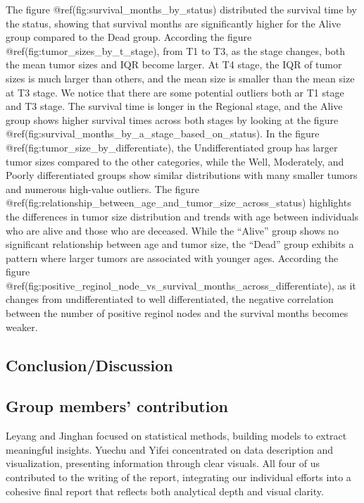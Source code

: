 \documentclass[
]{article}
\begin{document}
The figure @ref(fig:survival\_months\_by\_status) distributed the
survival time by the status, showing that survival months are
significantly higher for the Alive group compared to the Dead group.
According the figure @ref(fig:tumor\_sizes\_by\_t\_stage), from T1 to
T3, as the stage changes, both the mean tumor sizes and IQR become
larger. At T4 stage, the IQR of tumor sizes is much larger than others,
and the mean size is smaller than the mean size at T3 stage. We notice
that there are some potential outliers both ar T1 stage and T3 stage.
The survival time is longer in the Regional stage, and the Alive group
shows higher survival times across both stages by looking at the figure
@ref(fig:survival\_months\_by\_a\_stage\_based\_on\_status). In the
figure @ref(fig:tumor\_size\_by\_differentiate), the Undifferentiated
group has larger tumor sizes compared to the other categories, while the
Well, Moderately, and Poorly differentiated groups show similar
distributions with many smaller tumors and numerous high-value outliers.
The figure
@ref(fig:relationship\_between\_age\_and\_tumor\_size\_across\_status)
highlights the differences in tumor size distribution and trends with
age between individuals who are alive and those who are deceased. While
the ``Alive'' group shows no significant relationship between age and
tumor size, the ``Dead'' group exhibits a pattern where larger tumors
are associated with younger ages. According the figure
@ref(fig:positive\_reginol\_node\_vs\_survival\_months\_across\_differentiate),
as it changes from undifferentiated to well differentiated, the negative
correlation between the number of positive reginol nodes and the
survival months becomes weaker.

\subsection{Conclusion/Discussion}\label{conclusiondiscussion}

\subsection{Group members'
contribution}\label{group-members-contribution}

Leyang and Jinghan focused on statistical methods, building models to
extract meaningful insights. Yuechu and Yifei concentrated on data
description and visualization, presenting information through clear
visuals. All four of us contributed to the writing of the report,
integrating our individual efforts into a cohesive final report that
reflects both analytical depth and visual clarity.
\end{document}

